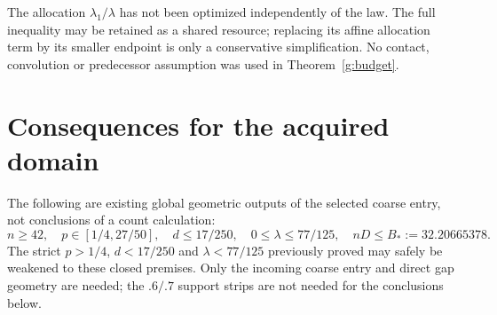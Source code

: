 \documentclass[11pt]{article}
\begin{document}
The allocation $\lambda_1/\lambda$ has not been optimized independently
of the law. The full inequality may be retained as a shared resource;
replacing its affine allocation term by its smaller endpoint is only a
conservative simplification. No contact, convolution or predecessor
assumption was used in Theorem~\ref{g:budget}.

\section{Consequences for the acquired domain}
The following are existing global geometric outputs of the selected
coarse entry, not conclusions of a count calculation:
\begin{equation}\label{g:input}
 n\ge42,\quad p\in[1/4,27/50],\quad d\le17/250,
 \quad0\le\lambda\le77/125,\quad nD\le B_*:=32.20665378.
\end{equation}
The strict $p>1/4$, $d<17/250$ and $\lambda<77/125$ previously proved
may safely be weakened to these closed premises. Only the incoming
coarse entry and direct gap geometry are needed; the $.6/ .7$ support
strips are not needed for the conclusions below.
\end{document}
